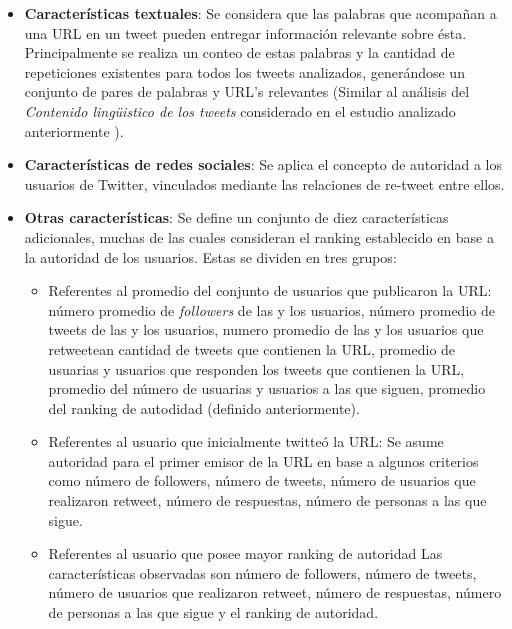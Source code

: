 \begin{itemize}
	\item \textbf{Características textuales}: Se considera que las palabras que acompañan a una URL en un tweet pueden entregar información relevante sobre ésta. Principalmente se realiza un conteo de estas palabras y la cantidad de repeticiones existentes para todos los tweets analizados, generándose un conjunto de pares de palabras y URL's relevantes (Similar al análisis del \emph{Contenido lingüistico de los tweets} considerado en el estudio analizado anteriormente \cite{PennacchiottiP11}).
	
	\item \textbf{Características de redes sociales}: Se aplica el concepto de autoridad a los usuarios de Twitter, vinculados mediante las relaciones de re-tweet entre ellos.
	
	\item \textbf{Otras características}: Se define un conjunto de diez características adicionales, muchas de las cuales consideran el ranking establecido en base a la autoridad de los usuarios. Estas se dividen en tres grupos:
		\begin{itemize}
		\item{Referentes al promedio del conjunto de usuarios que publicaron la URL}: número promedio de \emph{followers} de las y los usuarios, número promedio de tweets de las y los usuarios, numero promedio de las y los usuarios que retweetean cantidad de tweets que contienen la URL, promedio de usuarias y usuarios que responden los tweets que contienen la URL, promedio del número de usuarias y usuarios a las que siguen, promedio del ranking de autodidad (definido anteriormente).
		\item{Referentes al usuario que inicialmente twitteó la URL}: Se asume autoridad para el primer emisor de la URL en base a algunos criterios como número de followers, número de tweets, número de usuarios que realizaron retweet, número de respuestas, número de personas a las que sigue.
		\item{Referentes al usuario que posee mayor ranking de autoridad} Las características observadas son número de followers, número de tweets, número de usuarios que realizaron retweet, número de respuestas, número de personas a las que sigue y el ranking de autoridad.
		\end{itemize}
\end{itemize}
	
